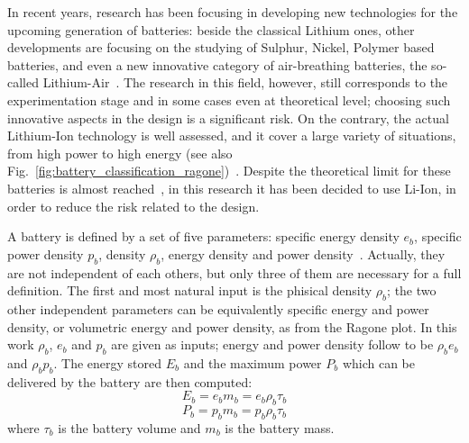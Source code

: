 In recent years, research has been focusing in developing new technologies for the upcoming generation of batteries: beside the classical Lithium ones, other developments are focusing on the studying of Sulphur, Nickel, Polymer based batteries, and even a new innovative category of air-breathing batteries, the so-called Lithium-Air~\cite{bib:fraunhofer, bib:heide}. 
The research in this field, however, still corresponds to the experimentation stage and in some cases even at theoretical level; choosing such innovative aspects in the design is a significant risk. 
On the contrary, the actual Lithium-Ion technology is well assessed, and it cover a large variety of situations, from high power to high energy (see also Fig.~\ref{fig:battery_classification_ragone})~\cite{bib:xue}.
Despite the theoretical limit for these batteries is almost reached~\cite{bib:fraunhofer}, in this research it has been decided to use Li-Ion, in order to reduce the risk related to the design.  

A battery is defined by a set of five parameters: specific energy density $e_b$, specific power density $p_b$, density $\rho_{b}$, energy density and power density~\cite{bib:cinar_methods, bib:lowry}.
Actually, they are not independent of each others, but only three of them are necessary for a full definition. 
The first and most natural input is the phisical density $\rho_{b}$; the two other independent parameters can be equivalently specific energy and power density, or volumetric energy and power density, as from the Ragone plot.
In this work $\rho_{b}$, $e_{b}$ and $p_{b}$ are given as inputs; energy and power density follow to be $\rho_{b} e_{b}$ and $\rho_{b} p_{b}$.
The energy stored $E_{b}$ and the maximum power $P_{b}$ which can be delivered by the battery are then computed:
\begin{equation}
E_{b} = e_{b}m_{b} = e_{b}\rho_{b}\tau_{b}
\label{eq:battery_energy}
\end{equation}
\begin{equation}
P_{b} = p_{b}m_{b} = p_{b}\rho_{b}\tau_{b}
\label{eq:battery_power}
\end{equation}
where $\tau_{b}$ is the battery volume and $m_{b}$ is the battery mass.

